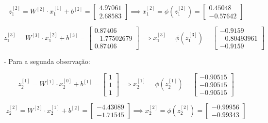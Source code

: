 \documentclass[a4paper,12pt]{article} %
\begin{document}
\begin{enumerate}
\begin{equation*}
    z^{[2]}_1 = W^{[2]} \cdot x^{[1]}_1 + b^{[2]} = \begin{bmatrix} 4.97061 \\ 2.68583 \end{bmatrix} \implies x^{[2]}_1 = \phi(z^{[2]}_1)= \begin{bmatrix} 0.45048 \\ -0.57642 \end{bmatrix}
\end{equation*}

\begin{equation*}
    z^{[3]}_1 = W^{[3]} \cdot x^{[2]}_1 + b^{[3]} = \begin{bmatrix} 0.87406 \\ -1.77502679 \\ 0.87406 \end{bmatrix} \implies x^{[3]}_1 = \phi(z^{[3]}_1)= \begin{bmatrix} -0.9159 \\ -0.80493961\\ -0.9159 \end{bmatrix}
\end{equation*}

- Para a segunda observação:

\begin{equation*}
    z^{[1]}_2 = W^{[1]} \cdot x^{[0]}_2 + b^{[1]} = \begin{bmatrix} 1 \\ 1 \\ 1 \end{bmatrix} \implies x^{[1]}_2 = \phi(z^{[1]}_2)= \begin{bmatrix} -0.90515 \\ -0.90515 \\ -0.90515 \end{bmatrix}
\end{equation*}

\begin{equation*}
    z^{[2]}_2 = W^{[2]} \cdot x^{[1]}_2 + b^{[2]} = \begin{bmatrix} -4.43089 \\ -1.71545 \end{bmatrix} \implies x^{[2]}_2 = \phi(z^{[2]}_2)= \begin{bmatrix} -0.99956 \\ -0.99343 \end{bmatrix}
\end{equation*}


\end{enumerate}
\end{document}

